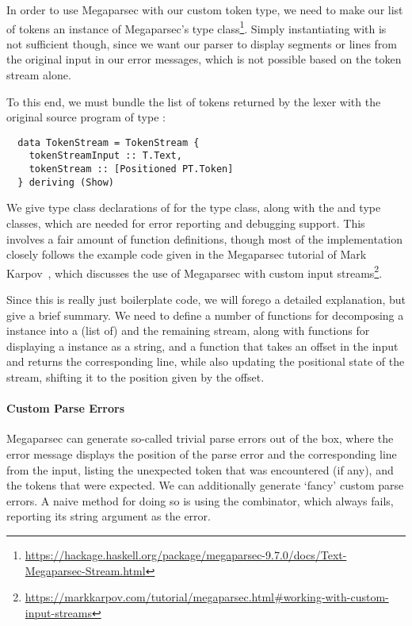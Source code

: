 In order to use Megaparsec with our custom token type, we need to make our list
of tokens an instance of Megaparsec's  type class\footnote{\url{https://hackage.haskell.org/package/megaparsec-9.7.0/docs/Text-Megaparsec-Stream.html}}.
Simply instantiating  with  is not
sufficient though, since we want our parser to display segments or lines from
the original input in our error messages, which is not possible based on the
token stream alone.

To this end, we must bundle the list of tokens returned by the lexer with the
original source program of type :
%
\begin{verbatim}
  data TokenStream = TokenStream {
    tokenStreamInput :: T.Text,
    tokenStream :: [Positioned PT.Token]
  } deriving (Show)
\end{verbatim}
%
We give type class declarations of  for the 
type class, along with the  and 
type classes, which are needed for error reporting and debugging support.
This involves a fair amount of function definitions, though most of the
implementation closely follows the example code given in the Megaparsec tutorial
of Mark Karpov~\citep{Karpov2019}, which discusses the use of Megaparsec with custom input
streams\footnote{\url{https://markkarpov.com/tutorial/megaparsec.html\#working-with-custom-input-streams}}.

Since this is really just boilerplate code, we will forego a detailed
explanation, but give a brief summary.
We need to define a number of functions for decomposing a 
instance into a (list of)  and the remaining stream,
along with functions for displaying a  instance as a
string, and a function that takes an offset in the input and returns the
corresponding line, while also updating the positional state of the stream,
shifting it to the position given by the offset.


\paragraph{Custom Parse Errors}

Megaparsec can generate so-called trivial parse errors out of the box, where the
error message displays the position of the parse error and the corresponding
line from the input, listing the unexpected token that was encountered (if any),
and the tokens that were expected.
We can additionally generate `fancy' custom parse errors. A naive method for
doing so is using the  combinator, which always fails, reporting
its string argument as the error.

